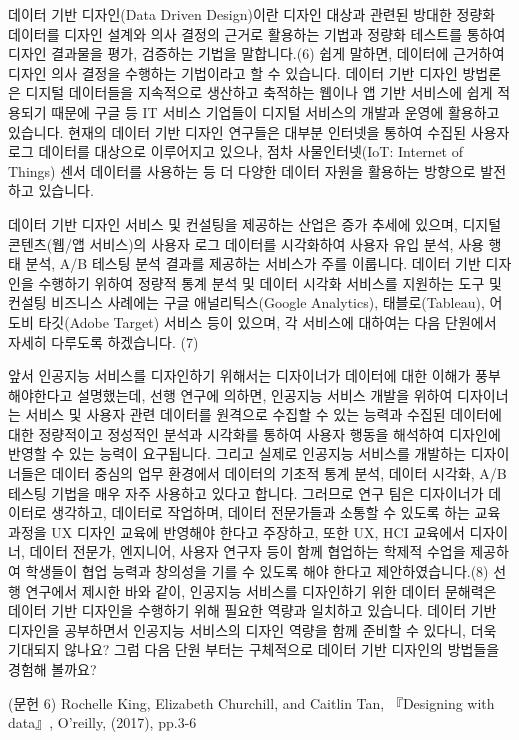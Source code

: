 \documentclass[
  letterpaper,
  DIV=11,
  numbers=noendperiod]{scrreprt}
\begin{document}
데이터 기반 디자인(Data Driven Design)이란 디자인 대상과 관련된 방대한
정량화 데이터를 디자인 설계와 의사 결정의 근거로 활용하는 기법과 정량화
테스트를 통하여 디자인 결과물을 평가, 검증하는 기법을 말합니다.(6) 쉽게
말하면, 데이터에 근거하여 디자인 의사 결정을 수행하는 기법이라고 할 수
있습니다. 데이터 기반 디자인 방법론은 디지털 데이터들을 지속적으로
생산하고 축적하는 웹이나 앱 기반 서비스에 쉽게 적용되기 때문에 구글 등
IT 서비스 기업들이 디지털 서비스의 개발과 운영에 활용하고 있습니다.
현재의 데이터 기반 디자인 연구들은 대부분 인터넷을 통하여 수집된 사용자
로그 데이터를 대상으로 이루어지고 있으나, 점차 사물인터넷(IoT: Internet
of Things) 센서 데이터를 사용하는 등 더 다양한 데이터 자원을 활용하는
방향으로 발전하고 있습니다.

데이터 기반 디자인 서비스 및 컨설팅을 제공하는 산업은 증가 추세에
있으며, 디지털 콘텐츠(웹/앱 서비스)의 사용자 로그 데이터를 시각화하여
사용자 유입 분석, 사용 행태 분석, A/B 테스팅 분석 결과를 제공하는
서비스가 주를 이룹니다. 데이터 기반 디자인을 수행하기 위하여 정량적 통계
분석 및 데이터 시각화 서비스를 지원하는 도구 및 컨설팅 비즈니스 사례에는
구글 애널리틱스(Google Analytics), 태블로(Tableau), 어도비 타깃(Adobe
Target) 서비스 등이 있으며, 각 서비스에 대하여는 다음 단원에서 자세히
다루도록 하겠습니다. (7)

앞서 인공지능 서비스를 디자인하기 위해서는 디자이너가 데이터에 대한
이해가 풍부해야한다고 설명했는데, 선행 연구에 의하면, 인공지능 서비스
개발을 위하여 디자이너는 서비스 및 사용자 관련 데이터를 원격으로 수집할
수 있는 능력과 수집된 데이터에 대한 정량적이고 정성적인 분석과 시각화를
통하여 사용자 행동을 해석하여 디자인에 반영할 수 있는 능력이 요구됩니다.
그리고 실제로 인공지능 서비스를 개발하는 디자이너들은 데이터 중심의 업무
환경에서 데이터의 기초적 통계 분석, 데이터 시각화, A/B 테스팅 기법을
매우 자주 사용하고 있다고 합니다. 그러므로 연구 팀은 디자이너가 데이터로
생각하고, 데이터로 작업하며, 데이터 전문가들과 소통할 수 있도록 하는
교육 과정을 UX 디자인 교육에 반영해야 한다고 주장하고, 또한 UX, HCI
교육에서 디자이너, 데이터 전문가, 엔지니어, 사용자 연구자 등이 함께
협업하는 학제적 수업을 제공하여 학생들이 협업 능력과 창의성을 기를 수
있도록 해야 한다고 제안하였습니다.(8) 선행 연구에서 제시한 바와 같이,
인공지능 서비스를 디자인하기 위한 데이터 문해력은 데이터 기반 디자인을
수행하기 위해 필요한 역량과 일치하고 있습니다. 데이터 기반 디자인을
공부하면서 인공지능 서비스의 디자인 역량을 함께 준비할 수 있다니, 더욱
기대되지 않나요? 그럼 다음 단원 부터는 구체적으로 데이터 기반 디자인의
방법들을 경험해 볼까요?

(문헌 6) Rochelle King, Elizabeth Churchill, and Caitlin Tan,
『Designing with data』, O'reilly, (2017), pp.3-6
\end{document}
